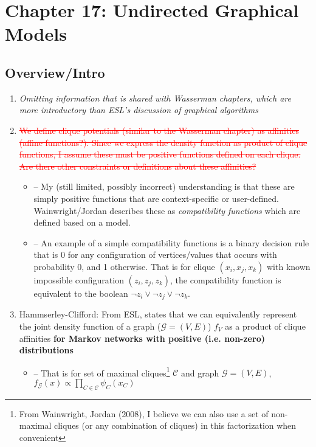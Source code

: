 \documentclass[11pt]{article}
\begin{document}
\section*{Chapter 17: Undirected Graphical Models}



\subsection*{Overview/Intro}
\begin{enumerate}
    \item \textit{Omitting information that is shared with Wasserman chapters, which are more introductory than ESL's discussion of graphical algorithms}
    \item \textcolor{red}{\sout{We define clique potentials (similar to the Wasserman chapter) as affinities (affine functions?). Since we express the density function as product of clique functions, I assume these must be positive functions defined on each clique. Are there other constraints or definitions about these affinities?}}
    	\begin{itemize}
            \item -- My (still limited, possibly incorrect) understanding is that these are simply positive functions that are context-specific or user-defined. Wainwright/Jordan describes these as {\it compatibility functions} which are defined based on a model. 
    	    \item -- An example of a simple compatibility functions is a binary decision rule that is 0 for any configuration of vertices/values that occurs with probability 0, and 1 otherwise. That is for clique $(x_i, x_j, x_k)$ with known impossible configuration $(z_i, z_j, z_k)$, the compatibility function is equivalent to the boolean $\lnot z_i \lor \lnot z_j \lor \lnot z_k$.
        \end{itemize}
    \item Hammserley-Clifford: From ESL, states that we can equivalently represent the joint density function of a graph ($\mathcal{G} = (V,E)$) $f_V$ as a product of clique affinities {\bf for Markov networks with positive (i.e. non-zero) distributions}
    \begin{itemize}
        \item -- That is for set of maximal cliques\footnote{
            From Wainwright, Jordan (2008), I believe we can also use a set of non-maximal cliques (or any combination of cliques) in this factorization when convenient
            } $\mathcal{C}$ and graph $\mathcal{G} = (V, E)$, $f_\mathcal{G}(x) \propto \prod_{C \in \mathcal{C}}\psi_C (x_C)$
    \end{itemize}


\end{enumerate}
\end{document}
